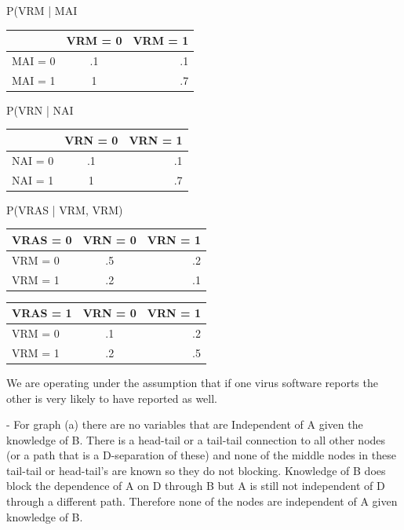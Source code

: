 \documentclass[solution, letterpaper]{cs121}
\begin{document}
\begin{empfile}
\begin{center}
\begin{emp}
\end{emp}
\end{center}

P(VRM | MAI\\
\begin{center}
\begin{tabular}{ l |c r }
   & VRM = 0 & VRM = 1 \\
   \hline
  MAI = 0 & .1 & .1 \\
  MAI = 1 & 1 & .7 \\
\end{tabular}
\end{center}


P(VRN | NAI\\
\begin{center}
\begin{tabular}{ l |c r }
   & VRN = 0 & VRN = 1 \\
   \hline
  NAI = 0 & .1 & .1 \\
  NAI = 1 & 1 & .7 \\
\end{tabular}
\end{center}


P(VRAS | VRM, VRM)\\
\begin{center}
\begin{tabular}{ l |c r }
   VRAS = 0 & VRN = 0& VRN = 1 \\
   \hline
  VRM = 0 & .5 & .2 \\
  VRM = 1 & .2 & .1 \\
\end{tabular}
\end{center}

\begin{center}
\begin{tabular}{ l |c r }
   VRAS = 1 & VRN = 0 & VRN = 1 \\
   \hline
  VRM = 0 & .1 & .2 \\
  VRM = 1 & .2 & .5 \\
\end{tabular}
\end{center}
We are operating under the assumption that if one virus software reports the other is very likely to have reported as well.

\subproblem 
- For graph (a) there are no variables that are Independent of A given the knowledge of B. There is a head-tail or a tail-tail connection to all other nodes (or a path that is a D-separation of these) and none of the middle nodes in these tail-tail or head-tail's are known so they do not blocking. Knowledge of B does block the dependence of A on D through B but A is still not independent of D through a different path. Therefore none of the nodes are independent of A given knowledge of B.\\


\end{empfile}
\end{document}
